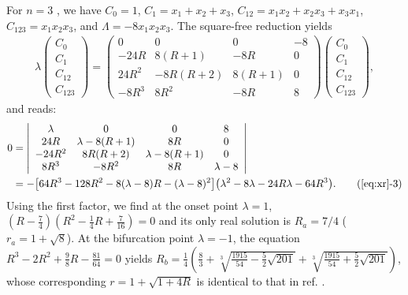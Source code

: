 \documentclass[preprint]{revtex4-1}
\begin{document}
For $n = 3$ \cite{saha, bechhoefer, gordon, burm, zhang},
we have
$C_0 = 1$,
$C_1 = x_1 + x_2 + x_3$,
$C_{12} = x_1 x_2 + x_2 x_3 + x_3 x_1$,
$C_{123} = x_1 x_2 x_3$,
and
$\Lambda = -8 x_1 x_2 x_3$.
%
The square-free reduction yields
%
%
%
\begin{align}
\lambda
\left( \begin{array}{c}
  C_0 \\
  C_1 \\
  C_{12} \\
  C_{123}
\end{array} \right)
=
\left( \begin{array}{cccc}
 0            & 0                 & 0               & -8 \\
 -24 R        & 8(R+1)            & -8R             & 0 \\
 24 R^2       & -8R(R+2)          & 8(R+1)          & 0 \\
 -8R^3        & 8R^2              & -8R             & 8
  \end{array} \right)
\left( \begin{array}{c}
  C_0 \\
  C_1 \\
  C_{12} \\
  C_{123}
\end{array} \right),
\end{align}
%
%
%
and  reads:
\begin{align}
  0
&=\left| \begin{array}{cccc}
 \lambda      & 0                 & 0               & 8 \\
 24 R         & \lambda - 8(R+1)  & 8R              & 0 \\
 -24 R^2      & 8R(R+2)           & \lambda-8(R+1)  & 0 \\
 8R^3         & -8R^2             & 8R              & \lambda-8
  \end{array} \right| \nonumber \\
&= -\big[
  64R^3 - 128 R^2 - 8 (\lambda - 8) R - (\lambda -8)^2
  \big]
  \big(
  \lambda^2 - 8\lambda - 24 R\lambda - 64 R^3
  \big).
  \tag{\ref{eq:xr}-3}
\label{eq:xr3}
\end{align}
%
Using the first factor, we find at the onset point
  $\lambda = 1$,
  $\left(
  R-\frac74
  \right)
  \left(
  R^2-\frac14 R + \frac{7}{16}
  \right)=0$
  and its only real solution is $R_a = 7/4$ ($r_a = 1+\sqrt 8$).
%
At the bifurcation point $\lambda = -1$,
  the equation $R^3-2R^2 + \frac{9}{8} R -\frac{81}{64}=0$
  yields
  $R_b = \frac14
      \left(
      \frac{8}{3} +
        \sqrt[3]{\frac{1915}{54} - \frac52\sqrt{201}}
       +\sqrt[3]{\frac{1915}{54} + \frac52\sqrt{201}}
      \right)$,
whose corresponding $r = 1+\sqrt{1+4R}$
is identical to that in ref. \cite{gordon, burm}.
%
\end{document}
